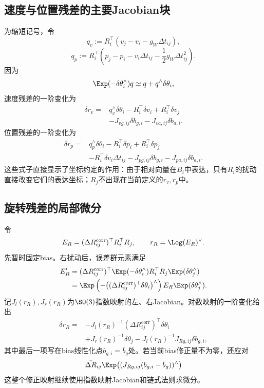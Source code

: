 \subsection{速度与位置残差的主要Jacobian块}

为缩短记号，令
\[
    q_v:=R_i^\top(v_j-v_i-g_W\Delta t_{ij}),
\]
\[
    q_p:=R_i^\top
      \left(
        p_j-p_i-v_i\Delta t_{ij}
        -\frac12g_W\Delta t_{ij}^2
      \right).
\]
因为
\[
    \Exp(-\delta\theta_i^\wedge)q
    \simeq q+q^\wedge\delta\theta_i,
\]
速度残差的一阶变化为
\[
\begin{aligned}
    \delta r_v
    ={}&q_v^\wedge\delta\theta_i
      -R_i^\top\delta v_i
      +R_i^\top\delta v_j\\
      &-J_{v g,ij}\delta b_{g,i}
      -J_{v a,ij}\delta b_{a,i}.
\end{aligned}
\]
位置残差的一阶变化为
\[
\begin{aligned}
    \delta r_p
    ={}&q_p^\wedge\delta\theta_i
      -R_i^\top\delta p_i
      +R_i^\top\delta p_j\\
      &-R_i^\top\delta v_i\Delta t_{ij}
      -J_{p g,ij}\delta b_{g,i}
      -J_{p a,ij}\delta b_{a,i}.
\end{aligned}
\]
这些式子直接显示了坐标约定的作用：由于相对向量在$B_i$中表达，只有$R_i$的扰动直接改变它们的表达坐标；$R_j$不出现在当前定义的$r_v,r_p$中。

\subsection{旋转残差的局部微分}

令
\[
    E_R=(\Delta R_{ij}^{\mathrm{corr}})^\top R_i^\top R_j,
    \qquad
    r_R=\Log(E_R)^\vee.
\]
先暂时固定bias。右扰动后，误差群元素满足
\[
\begin{aligned}
    E_R'
    &=(\Delta R_{ij}^{\mathrm{corr}})^\top
      \Exp(-\delta\theta_i^\wedge)
      R_i^\top R_j
      \Exp(\delta\theta_j^\wedge)\\
    &=\Exp\left(
        -\bigl((\Delta R_{ij}^{\mathrm{corr}})^\top
          \delta\theta_i\bigr)^\wedge
      \right)
      E_R
      \Exp(\delta\theta_j^\wedge).
\end{aligned}
\]
记$J_l(r_R),J_r(r_R)$为$\SO(3)$指数映射的左、右Jacobian。对数映射的一阶变化给出
\[
\boxed{
\begin{aligned}
    \delta r_R
    ={}&-J_l(r_R)^{-1}
       (\Delta R_{ij}^{\mathrm{corr}})^\top
       \delta\theta_i\\
      &+J_r(r_R)^{-1}\delta\theta_j
      -J_l(r_R)^{-1}J_{R g,ij}\delta b_{g,i},
\end{aligned}
}
\]
其中最后一项写在bias线性化点$b_{g,i}=\bar b_g$处。若当前bias修正量不为零，还应对
\[
    \bar{\Delta R}_{ij}
    \Exp\bigl((J_{R g,ij}(b_{g,i}-\bar b_g))^\wedge\bigr)
\]
这整个修正映射继续使用指数映射Jacobian和链式法则求微分。

